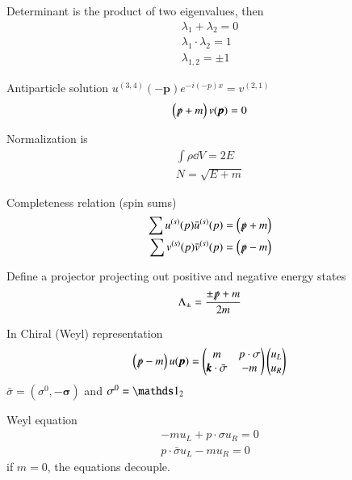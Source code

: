 Determinant is the product of two eigenvalues, then
\begin{align*}
   \lambda_1 + \lambda_2 = 0 \\
   \lambda_1 \cdot \lambda_2 = 1 \\
   \lambda_{1,2} = \pm 1
\end{align*}

Antiparticle solution $u^{(3,4)}(-\pmb{p}) e^{-i(-p)x} = v^{(2,1)}$
\begin{align}
   \left( \slashed{p} + m \right)v(\pmb{p}) = 0
\end{align}

Normalization is
\begin{align}
   \int \rho \dd{V} = 2E \\
   N = \sqrt{E+m}
\end{align}

Completeness relation (spin sums)
\begin{align}
   \sum u^{(s)}(p) \bar{u}^{(s)}(p ) = \left( \slashed{p} + m \right) \\
   \sum v^{(s)}(p) \bar{v}^{(s)}(p ) = \left( \slashed{p} - m \right)
\end{align}

Define a projector projecting out positive and negative energy states
\begin{align}
   \Lambda_{\pm} = \frac{\pm \slashed{p} + m}{2m}
\end{align}

In Chiral (Weyl) representation
\begin{align}
   \left( \slashed{p} - m \right) u(\pmb{p}) = \begin{pmatrix} m & p \cdot \sigma \\ \pmb{k} \cdot \bar{\sigma} & -m \end{pmatrix} \begin{pmatrix} u_L \\ u_R\end{pmatrix}
\end{align}
$\bar{\sigma} = (\sigma^0 , -\pmb{\sigma})$ and $\sigma^0 = \id_2$

Weyl equation
\begin{align}
   -m u_L + p\cdot \sigma u_R = 0 \\
   p \cdot \bar{\sigma} u_L - m u_R = 0
\end{align}
if $m=0$, the equations decouple.

